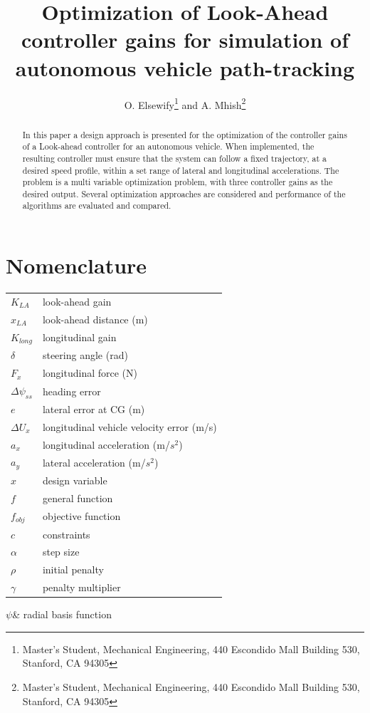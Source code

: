 \documentclass[conf]{new-aiaa}
\title{Optimization of Look-Ahead controller gains for simulation of autonomous vehicle path-tracking}
\author{O. Elsewify\footnote{Master's Student, Mechanical Engineering, 440 Escondido Mall Building 530, Stanford, CA 94305} and A. Mhish\footnote{Master's Student, Mechanical Engineering, 440 Escondido Mall Building 530, Stanford, CA 94305}}
\affil{Stanford University, Stanford, CA, 94305}
\begin{document}
\maketitle

\begin{abstract}
In this paper a design approach is presented for the optimization of the controller gains of a Look-ahead controller for an autonomous vehicle. When implemented, the resulting controller must ensure that the system can follow a fixed trajectory, at a desired speed profile, within a set range of lateral and longitudinal accelerations. The problem is a multi variable optimization problem, with three controller gains as the desired output.
Several optimization approaches are considered and performance of the algorithms are evaluated and compared.
\end{abstract}

\section{Nomenclature}

{\renewcommand\arraystretch{1.0}
\noindent\begin{longtable*}{@{}l @{\quad=\quad} l@{}}
$K_{LA}$ & look-ahead gain \\
$x_{LA}$ & look-ahead distance (m)\\
$K_{long}$& longitudinal gain \\
$\delta$ & steering angle (rad)\\
$F_{x}$ & longitudinal force (N) \\
$\Delta\psi_{ss}$& heading error \\
$e$ & lateral error at CG (m)\\
$\Delta U_x$ & longitudinal vehicle velocity error (m/s)\\
$a_x$ & longitudinal acceleration (m/$s^2$)\\
$a_y$ & lateral acceleration (m/$s^2$)\\
$x$ & design variable \\
$f$ & general function \\
$f_{obj}$   & objective function\\
$c$  & constraints \\
$\alpha$ & step size\\
$\rho$   & initial penalty \\
$\gamma$ & penalty multiplier\\
\end{longtable*}}
$\psi$& radial basis function \\
\end{document}
